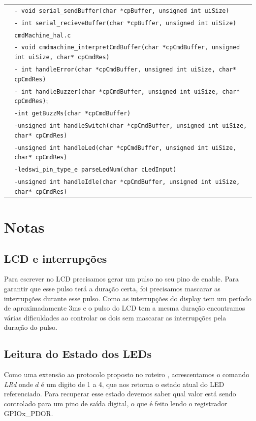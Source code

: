 \documentclass{article}
\begin{document}
\begin{table}[H]
{\begin{tabular}{|c|l|}
						& \texttt{- void serial\_sendBuffer(char *cpBuffer, unsigned int uiSize)}\\
						& \texttt{- int serial\_recieveBuffer(char *cpBuffer, unsigned int uiSize)}\\
						& \texttt{cmdMachine\_hal.c}\\
						& \texttt{- void cmdmachine\_interpretCmdBuffer(char *cpCmdBuffer, unsigned int uiSize, char* cpCmdRes)}\\
						& \texttt{- int handleError(char *cpCmdBuffer, unsigned int uiSize, char* cpCmdRes)}\\
						& \texttt{- int handleBuzzer(char *cpCmdBuffer, unsigned int uiSize, char* cpCmdRes)};\\
						& \texttt{-int getBuzzMs(char *cpCmdBuffer)}\\
						& \texttt{-unsigned int handleSwitch(char *cpCmdBuffer, unsigned int uiSize, char* cpCmdRes)}\\
						& \texttt{-unsigned int handleLed(char *cpCmdBuffer, unsigned int uiSize, char* cpCmdRes)}\\
						& \texttt{-ledswi\_pin\_type\_e parseLedNum(char cLedInput)}\\
						& \texttt{-unsigned int handleIdle(char *cpCmdBuffer, unsigned int uiSize, char* cpCmdRes)}\\
		\hline 
	\end{tabular}
	} 
	\normalsize
\end{table}
\section{Notas}
\subsection{LCD e interrupções}
Para escrever no LCD precisamos gerar um pulso no seu pino de enable. Para garantir que esse pulso terá a duração certa, foi precisamos mascarar as interrupções durante esse pulso. Como as interrupções do display tem um período de aproximadamente 3ms e o pulso do LCD tem a mesma duração encontramos várias dificuldades ao controlar os dois sem mascarar as interrupções pela duração do pulso.

\subsection{Leitura do Estado dos LEDs}
Como uma extensão ao protocolo proposto no roteiro \cite{bb:roteiro}, acrescentamos o comando \textit{LRd} onde $d$ é um digito de 1 a 4, que nos retorna o estado atual do LED referenciado. Para recuperar esse estado devemos saber qual valor está sendo controlado para um pino de saída digital, o que é feito lendo o registrador GPIOx\_PDOR.
\end{document}
